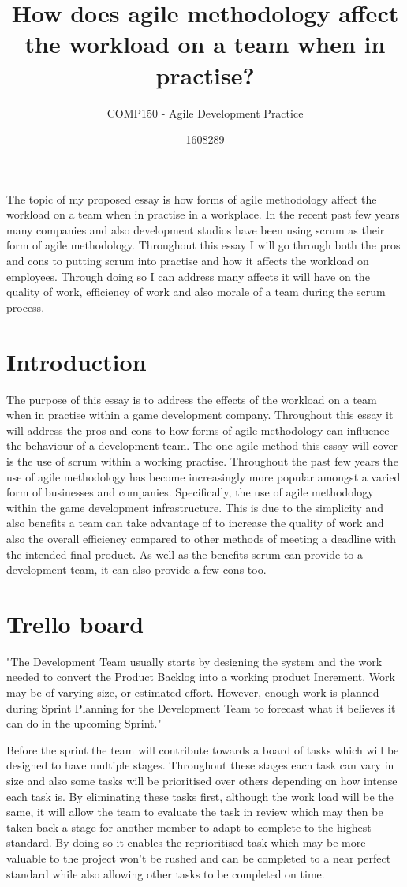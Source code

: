 \documentclass{scrartcl}
\title{How does agile methodology affect the workload on a team when in practise?}
\subtitle{COMP150 - Agile Development Practice}
\author{1608289}
\begin{document}
\maketitle


The topic of my proposed essay is how forms of agile methodology affect the workload on a team when in practise in a workplace. In the recent past few years many companies and also development studios have been using scrum as their form of agile methodology. Throughout this essay I will go through both the pros and cons to putting scrum into practise and how it affects the workload on employees. Through doing so I can address many affects it will have on the quality of work, efficiency of work and also morale of a team during the scrum process. 

\section{Introduction}
The purpose of this essay is to address the effects of the workload on a team when in practise within a game development company. Throughout this essay it will address the pros and cons to how forms of agile methodology can influence the behaviour of a development team. The one agile method this essay will cover is the use of scrum within a working practise. Throughout the past few years the use of agile methodology has become increasingly more popular amongst a varied form of businesses and companies. Specifically, the use of agile methodology within the game development infrastructure. This is due to the simplicity and also benefits a team can take advantage of to increase the quality of work and also the overall efficiency compared to other methods of meeting a deadline with the intended final product. As well as the benefits scrum can provide to a development team, it can also provide a few cons too. 

\section{Trello board}
"The Development Team usually starts by designing the system and the work needed to convert the Product Backlog into a working product Increment. Work may be of varying size, or estimated effort. However, enough work is planned during Sprint Planning for the Development Team to forecast what it believes it can do in the upcoming Sprint." \cite{scrum alliance}

Before the sprint the team will contribute towards a board of tasks which will be designed to have multiple stages. Throughout these stages each task can vary in size and also some tasks will be prioritised over others depending on how intense each task is. By eliminating these tasks first, although the work load will be the same, it will allow the team to evaluate the task in review which may then be taken back a stage for another member to adapt to complete to the highest standard. By doing so it enables the reprioritised task which may be more valuable to the project won’t be rushed and can be completed to a near perfect standard while also allowing other tasks to be completed on time.
\end{document}
